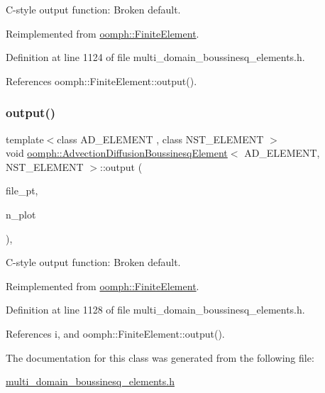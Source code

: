 C-\/style output function\+: Broken default. 



Reimplemented from \hyperlink{classoomph_1_1FiniteElement_a72cddd09f8ddbee1a20a1ff404c6943e}{oomph\+::\+Finite\+Element}.



Definition at line 1124 of file multi\+\_\+domain\+\_\+boussinesq\+\_\+elements.\+h.



References oomph\+::\+Finite\+Element\+::output().

\mbox{\label{classoomph_1_1AdvectionDiffusionBoussinesqElement_adbe60877f205b36d76a87695afb28caa}} 
\subsubsection{\texorpdfstring{output()}{output()}\hspace{0.1cm}{\footnotesize\ttfamily [4/4]}}
{\footnotesize\ttfamily template$<$class A\+D\+\_\+\+E\+L\+E\+M\+E\+NT , class N\+S\+T\+\_\+\+E\+L\+E\+M\+E\+NT $>$ \\
void \hyperlink{classoomph_1_1AdvectionDiffusionBoussinesqElement}{oomph\+::\+Advection\+Diffusion\+Boussinesq\+Element}$<$ A\+D\+\_\+\+E\+L\+E\+M\+E\+NT, N\+S\+T\+\_\+\+E\+L\+E\+M\+E\+NT $>$\+::output (\begin{DoxyParamCaption}\item[{F\+I\+LE $\ast$}]{file\+\_\+pt,  }\item[{const unsigned \&}]{n\+\_\+plot }\end{DoxyParamCaption})\hspace{0.3cm}{\ttfamily [inline]}, {\ttfamily [virtual]}}



C-\/style output function\+: Broken default. 



Reimplemented from \hyperlink{classoomph_1_1FiniteElement_adfaee690bb0608f03320eeb9d110d48c}{oomph\+::\+Finite\+Element}.



Definition at line 1128 of file multi\+\_\+domain\+\_\+boussinesq\+\_\+elements.\+h.



References i, and oomph\+::\+Finite\+Element\+::output().



The documentation for this class was generated from the following file\+:\begin{DoxyCompactItemize}
\item 
\hyperlink{multi__domain__boussinesq__elements_8h}{multi\+\_\+domain\+\_\+boussinesq\+\_\+elements.\+h}\end{DoxyCompactItemize}
